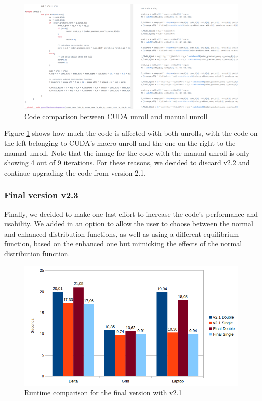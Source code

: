\documentclass[12pt]{book}
\begin{document}
   \begin{figure}[H]
   	\centering
   	\includegraphics[width=1.1\linewidth]{Resources/Images/unrollcode.png}
   	\caption{Code comparison between CUDA unroll and manual unroll}
   	\label{fig:unrollComp}
   \end{figure}

Figure \ref{fig:unrollComp} shows how much the code is affected with both unrolls, with the code on the left belonging to CUDA's macro unroll and the one on the right to the manual unroll. Note that the image for the code with the manual unroll is only showing 4 out of 9 iterations. For these reasons, we decided to discard v2.2 and continue upgrading the code from version 2.1.
\subsubsection{Final version v2.3}
Finally, we decided to make one last effort to increase the code's performance and usability. We added in an option to allow the user to choose between the normal and enhanced distribution functions, as well as using a different equilibrium function, based on the enhanced one but mimicking the effects of the normal distribution function. 

  \begin{figure}[H]
  	\centering
  	\includegraphics[width=\linewidth]{Resources/Images/vfv.png}
  	\caption{Runtime comparison for the final version with v2.1}
  	\label{fig:vfv}
  \end{figure}
  
\end{document}
